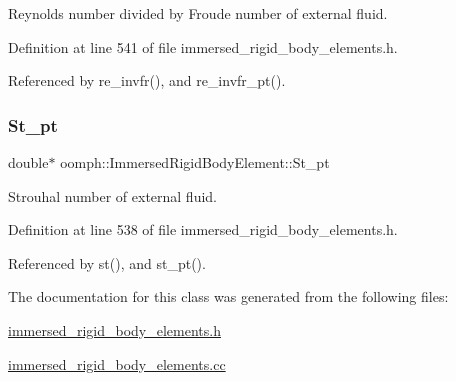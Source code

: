 Reynolds number divided by Froude number of external fluid. 



Definition at line 541 of file immersed\+\_\+rigid\+\_\+body\+\_\+elements.\+h.



Referenced by re\+\_\+invfr(), and re\+\_\+invfr\+\_\+pt().

\mbox{\label{classoomph_1_1ImmersedRigidBodyElement_a200f179da0403fd3af0076200832a2ac}} 
\subsubsection{\texorpdfstring{St\+\_\+pt}{St\_pt}}
{\footnotesize\ttfamily double$\ast$ oomph\+::\+Immersed\+Rigid\+Body\+Element\+::\+St\+\_\+pt\hspace{0.3cm}{\ttfamily [private]}}



Strouhal number of external fluid. 



Definition at line 538 of file immersed\+\_\+rigid\+\_\+body\+\_\+elements.\+h.



Referenced by st(), and st\+\_\+pt().



The documentation for this class was generated from the following files\+:\begin{DoxyCompactItemize}
\item 
\hyperlink{immersed__rigid__body__elements_8h}{immersed\+\_\+rigid\+\_\+body\+\_\+elements.\+h}\item 
\hyperlink{immersed__rigid__body__elements_8cc}{immersed\+\_\+rigid\+\_\+body\+\_\+elements.\+cc}\end{DoxyCompactItemize}
